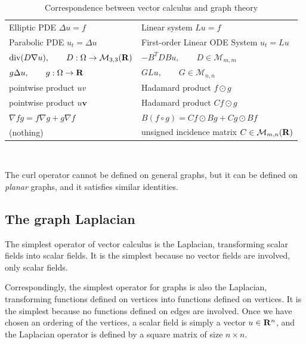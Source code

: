 \begin{table}[ht]
\begin{tabular}{l|l}
		Elliptic PDE $\Delta u = f$&
		Linear system $Lu=f$\\
	
		Parabolic PDE $u_t = \Delta u$&
		First-order Linear ODE System $u_t=Lu$\\
	
		$\textrm{div}(D\nabla u),\qquad
			D:\Omega\to\mathcal{M}_{3,3}(\mathbf{R})$&
		$-B^TDBu,\qquad D\in\mathcal{M}_{m,m}$\\
	
		$g\Delta u,\qquad g:\Omega\to\mathbf{R}$&
		$GLu,\qquad G\in\mathcal{M}_{n,n}$\\
	
		pointwise product $u v$&
		Hadamard product $f\odot g$\\
	
		pointwise product $u\mathbf{v}$&
		Hadamard product $Cf\odot g$\\
	
		$\nabla fg=f\nabla g + g\nabla f$&
		$B(f\circ g)=Cf\odot Bg + Cg\odot Bf$\\
	
		(nothing)&
		unsigned incidence matrix $C\in\mathcal{M}_{m,n}(\mathbf{R})$\\
\end{tabular}

$ $
\caption{ %
Correspondence between vector calculus and graph theory
}
\end{table}

The $\mathrm{curl}$ operator cannot be defined on general graphs, but it
can be defined on \emph{planar} graphs, and it satisfies similar identities.




\subsection{The graph Laplacian}


The simplest operator of vector calculus is the Laplacian, transforming
scalar fields into scalar fields.  It is the simplest because no vector fields
are involved, only scalar fields.



Correspondingly, the simplest operator for graphs is also the Laplacian,
transforming functions defined on vertices into functions defined on
vertices.  It is the simplest because no functions defined on edges are
involved.  Once we have chosen an ordering of the vertices, a scalar field is
simply a vector $u\in\mathbf{R}^n$, and the Laplacian operator is defined by a square
matrix of size $n\times n$.


